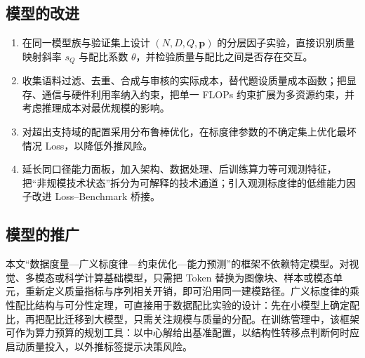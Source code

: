 \subsection{模型的改进}

\begin{enumerate}
\item 在同一模型族与验证集上设计 $(N,D,Q,\boldsymbol p)$ 的分层因子实验，直接识别质量映射斜率 $s_Q$ 与配比系数 $\theta$，并检验质量与配比之间是否存在交互。
\item 收集语料过滤、去重、合成与审核的实际成本，替代题设质量成本函数；把显存、通信与硬件利用率纳入约束，把单一 FLOPs 约束扩展为多资源约束，并考虑推理成本对最优规模的影响\cite{sardana2024beyond}。
\item 对超出支持域的配置采用分布鲁棒优化，在标度律参数的不确定集上优化最坏情况 Loss，以降低外推风险。
\item 延长同口径能力面板，加入架构、数据处理、后训练算力等可观测特征，把“非规模技术状态”拆分为可解释的技术通道；引入观测标度律\cite{ruan2024observational}的低维能力因子改进 Loss--Benchmark 桥接。
\end{enumerate}

\subsection{模型的推广}

本文“数据度量—广义标度律—约束优化—能力预测”的框架不依赖特定模型。对视觉、多模态或科学计算基础模型，只需把 Token 替换为图像块、样本或模态单元，重新定义质量指标与序列相关开销，即可沿用同一建模路径。广义标度律的乘性配比结构与可分性定理，可直接用于数据配比实验的设计：先在小模型上确定配比，再把配比迁移到大模型，只需关注规模与质量的分配。在训练管理中，该框架可作为算力预算的规划工具：以中心解给出基准配置，以结构性转移点判断何时应启动质量投入，以外推标签提示决策风险。
